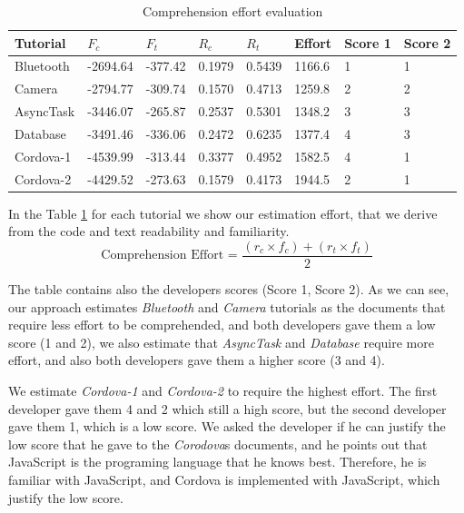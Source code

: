 \documentclass[12pt,mscthesis]{usiinfthesis}
\begin{document}
{\begin {table}[H]
	\begin{center}
    \begin{tabular}{| l | l | l | l | l | l | l | l |}
    \hline
\textbf{Tutorial}	&  \textbf{$F_{c}$}	& \textbf{$F_{t}$}	& \textbf{$R_c$}	& \textbf{$R_t$}	& \textbf{Effort}	& \textbf{ Score 1}&  \textbf{Score 2}\\ \hline
Bluetooth   & -2694.64	& -377.42	& 0.1979 	& 0.5439	& 1166.6	& 1	& 1\\ \hline
Camera		& -2794.77	& -309.74	& 0.1570	& 0.4713	& 1259.8	& 2	& 2\\ \hline
AsyncTask	& -3446.07	& -265.87	& 0.2537	& 0.5301	& 1348.2	& 3	& 3\\ \hline
Database	& -3491.46	& -336.06	& 0.2472	& 0.6235	& 1377.4	& 4	& 3\\ \hline
Cordova-1	& -4539.99	& -313.44	& 0.3377	& 0.4952	& 1582.5	& 4	& 1\\ \hline
Cordova-2	& -4429.52	& -273.63	& 0.1579	& 0.4173	& 1944.5	& 2	& 1\\ \hline
   \end{tabular}
	\end{center}
	\caption{Comprehension effort evaluation} \label{tab:comprehension-effort} 
	\end{table}

In the Table \ref{tab:comprehension-effort} for each tutorial we show our estimation effort, that we derive from the code and text readability and familiarity.
\[\text{Comprehension Effort = }\frac{(r_{c}\times f_{c}) + (r_{t} \times f_{t})}{2} \]

The table contains also the developers scores (Score 1, Score 2). As we can see, our approach estimates \emph{Bluetooth} and \emph{Camera} tutorials as the documents that require less effort to be comprehended, and both developers gave them a low score (1 and 2), we also estimate that \emph{AsyncTask} and \emph{Database} require more effort, and also both developers gave them a higher score (3 and 4).

We estimate \emph{Cordova-1} and \emph{Cordova-2} to require the highest effort. The first developer gave them 4 and 2 which still a high score, but the second developer gave them 1, which is a low score. We asked the developer if he can justify the low score that he gave to the \emph{Corodova}s documents, and he points out that JavaScript is the programing language that he knows best. Therefore, he is familiar with JavaScript, and Cordova is implemented with JavaScript, which justify the low score.


}
\end{document}
